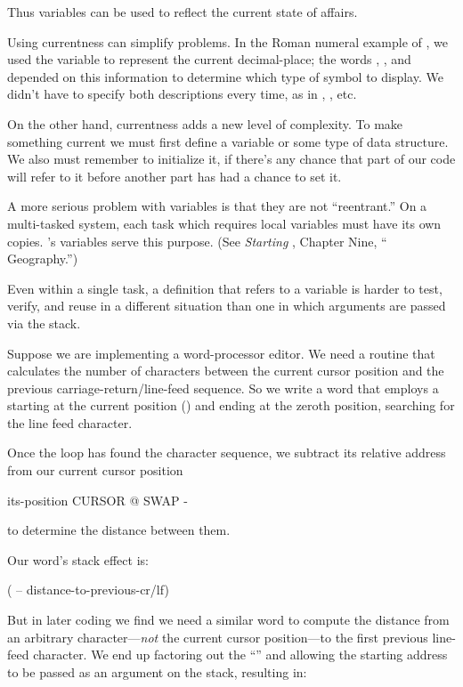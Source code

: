 Thus variables can be used to reflect the current state of affairs.

Using currentness can simplify problems. In the Roman numeral example
of , we used the variable  to represent the
current decimal-place; the words , , and
 depended on this information to determine which type of
symbol to display. We didn't have to specify both descriptions every
time, as in , , etc.

On the other hand, currentness adds a new level of complexity. To
make something current we must first define a variable or some type of
data structure. We also must remember to initialize it, if there's any
chance that part of our code will refer to it before another part has had a
chance to set it.

A more serious problem with variables is that they are not ``reentrant.''
On a multi-tasked \Forth{} system, each task which requires
local variables must have its own copies. \Forth{}'s  variables
serve this purpose. (See \emph{Starting \Forth{}}, Chapter Nine, ``\Forth{}
Geography.'')

Even within a single task, a definition that refers to a variable is
harder to test, verify, and reuse in a different situation than one in which
arguments are passed via the stack.

Suppose we are implementing a word-processor editor. We need a
routine that calculates the number of characters between the current cursor
position and the previous carriage-return/line-feed sequence. So we
write a word that employs a   starting at the current position
() and ending at the zeroth position, searching for the line
feed character.

Once the loop has found the character sequence, we subtract its
relative address from our current cursor position

\begin{Code}
its-position CURSOR @  SWAP -
\end{Code}
to determine the distance between them.

Our word's stack effect is:

\begin{Code}
( -- distance-to-previous-cr/lf)
\end{Code}
But in later coding we find we need a similar word to compute the
distance from an arbitrary character---\emph{not} the current cursor
position---to the first previous line-feed character. We end up factoring
out the ``'' and allowing the starting address to be passed as an
argument on the stack, resulting in:

